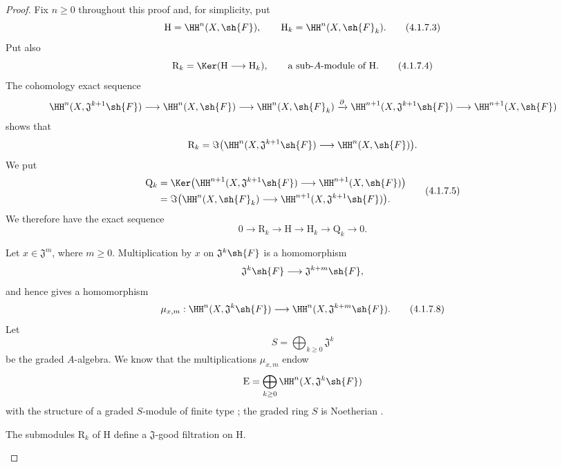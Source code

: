 \begin{proof}
Fix $n\geq0$ throughout this proof and, for simplicity, put
\[
  \mathrm{H}=\HH^n(X,\sh{F}),
  \qquad
  \mathrm{H}_k=\HH^n(X,\sh{F}_k).
  \tag{4.1.7.3}
  \label{III.4.1.7.3}
\]
Put also
\[
  \mathrm{R}_k
  =
  \Ker(\mathrm{H}\longrightarrow\mathrm{H}_k),
  \qquad
  \text{a sub-$A$-module of $\mathrm{H}$.}
  \tag{4.1.7.4}
  \label{III.4.1.7.4}
\]
The cohomology exact sequence
\[
  \HH^n(X,\mathfrak{J}^{k+1}\sh{F})
  \longrightarrow
  \HH^n(X,\sh{F})
  \longrightarrow
  \HH^n(X,\sh{F}_k)
  \xrightarrow{\partial}
  \HH^{n+1}(X,\mathfrak{J}^{k+1}\sh{F})
  \longrightarrow
  \HH^{n+1}(X,\sh{F})
\]
shows that
\[
  \mathrm{R}_k
  =
  \Im\bigl(
    \HH^n(X,\mathfrak{J}^{k+1}\sh{F})
    \longrightarrow
    \HH^n(X,\sh{F})
  \bigr).
\]
We put
\[
  \begin{split}
  \mathrm{Q}_k
  &=
  \Ker\bigl(
    \HH^{n+1}(X,\mathfrak{J}^{k+1}\sh{F})
    \longrightarrow
    \HH^{n+1}(X,\sh{F})
  \bigr)
  \\
  &=
  \Im\bigl(
    \HH^n(X,\sh{F}_k)
    \longrightarrow
    \HH^{n+1}(X,\mathfrak{J}^{k+1}\sh{F})
  \bigr).
  \end{split}
  \tag{4.1.7.5}
  \label{III.4.1.7.5}
\]
We therefore have the exact sequence
\[
  0\longrightarrow\mathrm{R}_k
  \longrightarrow\mathrm{H}
  \longrightarrow\mathrm{H}_k
  \longrightarrow\mathrm{Q}_k
  \longrightarrow0.
  \tag{4.1.7.6}
  \label{III.4.1.7.6}
\]

\begin{env}[4.1.7.7]
\label{III.4.1.7.7}
Let $x\in\mathfrak{J}^m$, where $m\geq0$.
Multiplication by $x$ on $\mathfrak{J}^k\sh{F}$ is a homomorphism
\[
  \mathfrak{J}^k\sh{F}
  \longrightarrow
  \mathfrak{J}^{k+m}\sh{F},
\]
and hence gives a homomorphism
\[
  \mu_{x,m}:
  \HH^n(X,\mathfrak{J}^k\sh{F})
  \longrightarrow
  \HH^n(X,\mathfrak{J}^{k+m}\sh{F}).
  \tag{4.1.7.8}
  \label{III.4.1.7.8}
\]
Let
\[
  S=\bigoplus_{k\geq0}\mathfrak{J}^k
\]
be the graded $A$-algebra.
We know that the multiplications $\mu_{x,m}$ endow
\[
  \mathrm{E}
  =
  \bigoplus_{k\geq0}
  \HH^n(X,\mathfrak{J}^k\sh{F})
\]
with the structure of a graded $S$-module of finite type
; the graded ring $S$ is Noetherian
.
\end{env}

\begin{lemma}[4.1.7.9]
\label{III.4.1.7.9}
The submodules $\mathrm{R}_k$ of $\mathrm{H}$ define a
$\mathfrak{J}$-good filtration on $\mathrm{H}$.
\end{lemma}


\end{proof}
